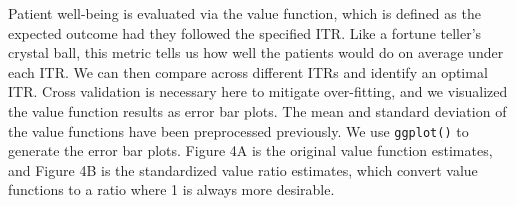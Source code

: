 \documentclass[
  letterpaper,
  DIV=11,
  numbers=noendperiod]{scrreprt}
\newenvironment{Shaded}{\begin{snugshade}}{\end{snugshade}}
\newcommand{\AttributeTok}[1]{\textcolor[rgb]{0.40,0.45,0.13}{#1}}
\newcommand{\CommentTok}[1]{\textcolor[rgb]{0.37,0.37,0.37}{#1}}
\newcommand{\DecValTok}[1]{\textcolor[rgb]{0.68,0.00,0.00}{#1}}
\newcommand{\DocumentationTok}[1]{\textcolor[rgb]{0.37,0.37,0.37}{\textit{#1}}}
\newcommand{\FloatTok}[1]{\textcolor[rgb]{0.68,0.00,0.00}{#1}}
\newcommand{\FunctionTok}[1]{\textcolor[rgb]{0.28,0.35,0.67}{#1}}
\newcommand{\NormalTok}[1]{\textcolor[rgb]{0.00,0.23,0.31}{#1}}
\newcommand{\OtherTok}[1]{\textcolor[rgb]{0.00,0.23,0.31}{#1}}
\newcommand{\SpecialCharTok}[1]{\textcolor[rgb]{0.37,0.37,0.37}{#1}}
\newcommand{\StringTok}[1]{\textcolor[rgb]{0.13,0.47,0.30}{#1}}
\begin{document}
Patient well-being is evaluated via the value function, which is defined
as the expected outcome had they followed the specified ITR. Like a
fortune teller's crystal ball, this metric tells us how well the
patients would do on average under each ITR. We can then compare across
different ITRs and identify an optimal ITR. Cross validation is
necessary here to mitigate over-fitting, and we visualized the value
function results as error bar plots. The mean and standard deviation of
the value functions have been preprocessed previously. We use
\texttt{ggplot()} to generate the error bar plots. Figure 4A is the
original value function estimates, and Figure 4B is the standardized
value ratio estimates, which convert value functions to a ratio where 1
is always more desirable.

\begin{Shaded}
\end{Shaded}
\end{document}
